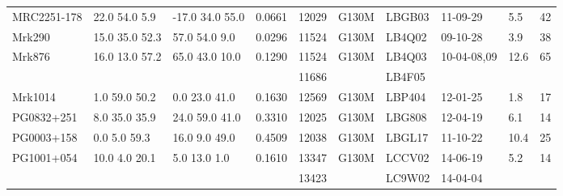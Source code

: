\documentclass[twocolumn,tighten]{aastex6}
\begin{document}
\begin{table}[ht]
\begin{center}
\begin{tabular}{l l l l l l l l l l}
MRC2251-178  	 &   22.0  54.0  5.9  &    -17.0  34.0  55.0  &   0.0661   & 12029  		    &   G130M  &   LBGB03                 & 11-09-29                   &  5.5   &      42         \\
Mrk290  			&  15.0  35.0  52.3  &     57.0  54.0  9.0    &    0.0296  & 11524		    &   G130M  &   LB4Q02   		& 09-10-28  		   &   3.9  &      38         \\
Mrk876  			&  16.0  13.0  57.2  &    65.0  43.0  10.0   &    0.1290  & 11524		    &   G130M  &   LB4Q03			& 10-04-08,09  		   & 12.6  &      65         \\
				 &			      &				       &		 & 11686		    &		      &   LB4F05			&				   &	       &	  	   \\

Mrk1014  		&    1.0  59.0  50.2  &    0.0  23.0  41.0     &    0.1630  & 12569  		    &   G130M  &   LBP404   	 	& 12-01-25  		   &  1.8   &      17         \\
PG0832+251  		&    8.0  35.0  35.9  &    24.0  59.0  41.0   &    0.3310  & 12025  		    &   G130M  &   LBG808			& 12-04-19		   &  6.1   &      14         \\
PG0003+158  		&     0.0  5.0  59.3   &     16.0  9.0  49.0    &    0.4509  & 12038  		    &   G130M  &   LBGL17  		& 11-10-22  		   & 10.4  &      25         \\
PG1001+054  		&    10.0  4.0  20.1  &       5.0  13.0  1.0    &    0.1610  & 13347		    &   G130M  &   LCCV02 		& 14-06-19  		   &  5.2   &      14         \\
				&			      &				       &		 & 13423		    &		      &   LC9W02		& 14-04-04		   &	       &	  	   \\


\end{tabular}
\end{center}
\end{table}
\end{document}
